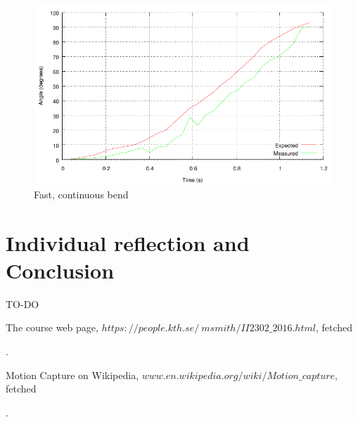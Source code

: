 \documentclass[a4paper, 12pt]{article}
\begin{document}
\begin{figure}[H]
    \centering
    \includegraphics[scale=1.15]{fast_continuous.pdf}
    \caption{Fast, continuous bend}
    \label{fig:pic9}
\end{figure}

\section*{Individual reflection and Conclusion}
TO-DO



\begin{thebibliography}{7}

	The course web page,
	\textit{$https://people.kth.se/~msmith/II2302\_2016.html$}, fetched \date{\today{}}.

	Motion Capture on Wikipedia,
	\textit{$www.en.wikipedia.org/wiki/Motion\_capture$}, fetched \date{\today{}}.


	


\end{thebibliography}
\end{document}
